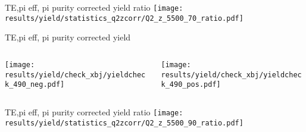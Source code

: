 \begin{frame}{TE,pi eff, pi purity corrected yield ratio}
\texttt{[image: results/yield/statistics\_q2zcorr/Q2\_z\_5500\_70\_ratio.pdf]}
\end{frame}
\begin{frame}{TE,pi eff, pi purity corrected yield}
\begin{columns}
\begin{column}[T]{0.5\textwidth}
\texttt{[image: results/yield/check\_xbj/yieldcheck\_490\_neg.pdf]}
\end{column}
\begin{column}[T]{0.5\textwidth}
\texttt{[image: results/yield/check\_xbj/yieldcheck\_490\_pos.pdf]}
\end{column}
\end{columns}
\end{frame}
\begin{frame}{TE,pi eff, pi purity corrected yield ratio}
\texttt{[image: results/yield/statistics\_q2zcorr/Q2\_z\_5500\_90\_ratio.pdf]}
\end{frame}
